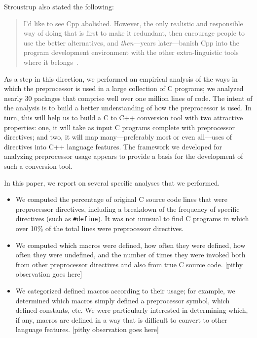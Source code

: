Stroustrup also stated the following:
\begin{quote}
I'd like to see Cpp abolished.  However, the only realistic and
responsible way of doing that is first to make it redundant, then
encourage people to use the better alternatives, and {\em
then\/}---years later---banish Cpp into the program development
environment with the other extra-linguistic tools where it
belongs~\cite[p.~426]{Stroustrup-DesignEvolution}.
\end{quote}

As a step in this direction, we performed an empirical analysis of the
ways in which the preprocessor is used in a large collection of C
programs; we analyzed nearly 30 packages that comprise well over one
million lines of code.  The intent of the analysis is to build a
better understanding of how the preprocessor is used.  In turn, this
will help us to build a C to C++ conversion tool with two attractive
properties: one, it will take as input C programs complete with
preprocessor directives; and two, it will map many---preferably most
or even all---uses of directives into C++ language features.  The
framework we developed for analyzing preprocessor usage appears to
provide a basis for the development of such a conversion tool.

In this paper, we report on several specific analyses that we
performed.  
\begin{itemize}

\item We computed the percentage of original C source code lines that
were preprocessor directives, including a breakdown of the frequency
of specific directives (such as \verb+#define+).  It was not unusual
to find C programs in which over 10\% of the total lines were
preprocessor directives.

\item We computed which macros were defined, how often they were
defined, how often they were undefined, and the number of times they
were invoked both from other preprocessor directives and also from
true C source code.  [pithy observation goes here]

\item We categorized defined macros according to their usage; for
example, we determined which macros simply defined a preprocessor
symbol, which defined constants, etc.  We were particularly interested
in determining which, if any, macros are defined in a way that is
difficult to convert to other language features.  [pithy observation
goes here]

\end{itemize}

